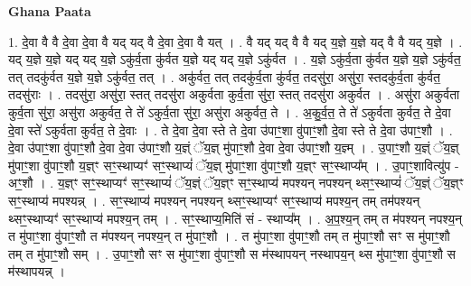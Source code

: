 \documentclass[17pt]{extarticle}
\begin{document}
\textbf{Ghana Paata } \newline

1. दे॒वा वै वै दे॒वा दे॒वा वै यद् यद् वै दे॒वा दे॒वा वै यत् । . वै यद् यद् वै वै यद् य॒ज्ञे य॒ज्ञे यद् वै वै यद् य॒ज्ञे । . यद् य॒ज्ञे य॒ज्ञे यद् यद् य॒ज्ञे ऽकु॑र्व॒ता कु॑र्वत य॒ज्ञे यद् यद् य॒ज्ञे ऽकु॑र्वत । . य॒ज्ञे ऽकु॑र्व॒ता कु॑र्वत य॒ज्ञे य॒ज्ञे ऽकु॑र्वत॒ तत् तदकु॑र्वत य॒ज्ञे य॒ज्ञे ऽकु॑र्वत॒ तत् । . अकु॑र्वत॒ तत् तदकु॑र्व॒ता कु॑र्वत॒ तदसु॑रा॒ असु॑रा॒ स्तदकु॑र्व॒ता कु॑र्वत॒ तदसु॑राः । . तदसु॑रा॒ असु॑रा॒ स्तत् तदसु॑रा अकुर्वता कुर्व॒ता सु॑रा॒ स्तत् तदसु॑रा अकुर्वत । . असु॑रा अकुर्वता कुर्व॒ता सु॑रा॒ असु॑रा अकुर्वत॒ ते ते॑ ऽकुर्व॒ता सु॑रा॒ असु॑रा अकुर्वत॒ ते । . अ॒कु॒र्व॒त॒ ते ते॑ ऽकुर्वता कुर्वत॒ ते दे॒वा दे॒वा स्ते॑ ऽकुर्वता कुर्वत॒ ते दे॒वाः । . ते दे॒वा दे॒वा स्ते ते दे॒वा उ॑पाꣳ॒॒शा वु॑पाꣳ॒॒शौ दे॒वा स्ते ते दे॒वा उ॑पाꣳ॒॒शौ । . दे॒वा उ॑पाꣳ॒॒शा वु॑पाꣳ॒॒शौ दे॒वा दे॒वा उ॑पाꣳ॒॒शौ य॒ज्ञ्ं ॅय॒ज्ञ् मु॑पाꣳ॒॒शौ दे॒वा दे॒वा उ॑पाꣳ॒॒शौ य॒ज्ञ्म् । . उ॒पाꣳ॒॒शौ य॒ज्ञ्ं ॅय॒ज्ञ् मु॑पाꣳ॒॒शा वु॑पाꣳ॒॒शौ य॒ज्ञ्ꣳ सꣳ॒॒स्थाप्यꣳ॑ सꣳ॒॒स्थाप्यं॑ ॅय॒ज्ञ् मु॑पाꣳ॒॒शा वु॑पाꣳ॒॒शौ य॒ज्ञ्ꣳ सꣳ॒॒स्थाप्य᳚म् । . उ॒पाꣳ॒॒शावित्यु॑प - अꣳ॒॒शौ । . य॒ज्ञ्ꣳ सꣳ॒॒स्थाप्यꣳ॑ सꣳ॒॒स्थाप्यं॑ ॅय॒ज्ञ्ं ॅय॒ज्ञ्ꣳ सꣳ॒॒स्थाप्य॑ मपश्यन् नपश्यन् थ्सꣳ॒॒स्थाप्यं॑ ॅय॒ज्ञ्ं ॅय॒ज्ञ्ꣳ सꣳ॒॒स्थाप्य॑ मपश्यन्न् । . सꣳ॒॒स्थाप्य॑ मपश्यन् नपश्यन् थ्सꣳ॒॒स्थाप्यꣳ॑ सꣳ॒॒स्थाप्य॑ मपश्य॒न् तम् तम॑पश्यन् थ्सꣳ॒॒स्थाप्यꣳ॑ सꣳ॒॒स्थाप्य॑ मपश्य॒न् तम् । . सꣳ॒॒स्थाप्य॒मिति॑ सं - स्थाप्य᳚म् । . अ॒प॒श्य॒न् तम् त म॑पश्यन् नपश्य॒न् त मु॑पाꣳ॒॒शा वु॑पाꣳ॒॒शौ त म॑पश्यन् नपश्य॒न् त मु॑पाꣳ॒॒शौ । . त मु॑पाꣳ॒॒शा वु॑पाꣳ॒॒शौ तम् त मु॑पाꣳ॒॒शौ सꣳ स मु॑पाꣳ॒॒शौ तम् त मु॑पाꣳ॒॒शौ सम् । . उ॒पाꣳ॒॒शौ सꣳ स मु॑पाꣳ॒॒शा वु॑पाꣳ॒॒शौ स म॑स्थापयन् नस्थापय॒न् थ्स मु॑पाꣳ॒॒शा वु॑पाꣳ॒॒शौ स म॑स्थापयन्न् । \newline
\end{document}
